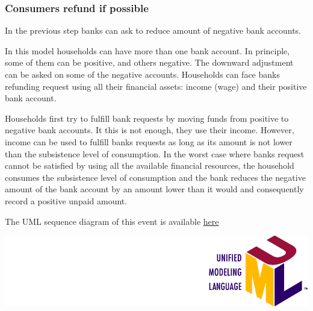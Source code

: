 \documentclass{book}
\newcommand{\umllocation}{file:///Users/giulioni/Dropbox/svn/sfcabm_my/documentation}
\begin{document}
\subsubsection{Consumers refund if possible}

In the previous step banks can ask to reduce amount of negative bank accounts. 

In this model households can have more than one bank account. In principle, some of them can be positive, and others negative. The downward adjustment can be asked on some of the negative accounts.  Households can face banks refunding request using all their financial assets: income (wage) and their positive bank account. 

Households first try to fulfill bank requests by moving funds from positive to negative bank accounts. It this is not enough, they use their income. However, income can be used to fulfill banks requests as long as its amount is not lower than the subsistence level of consumption. In the worst case where banks request cannot be satisfied by using all the available financial resources, the household consumes the subsistence level of consumption and the bank reduces the negative amount of the bank account by an amount lower than it would and consequently record a positive unpaid amount.     

The UML sequence diagram of this event is available \href{\umllocation/payBackBankDebt.html}{here}
\begin{marginfigure}
	\includegraphics[scale=0.1]{uml.png}
\end{marginfigure}


\end{document}
